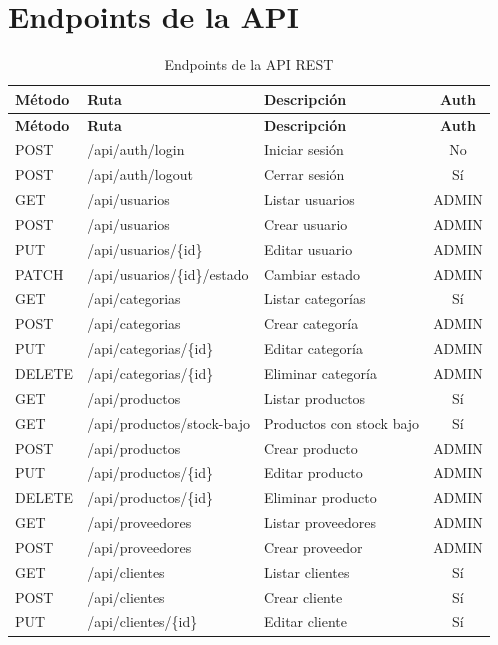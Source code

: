 \documentclass[12pt, letterpaper]{report}
\begin{document}
\section*{Endpoints de la API}

\begin{longtable}{|l|l|p{5cm}|c|}
\caption{Endpoints de la API REST} \\
\hline
\textbf{Método} & \textbf{Ruta} & \textbf{Descripción} & \textbf{Auth} \\ \hline
\endfirsthead
\hline
\textbf{Método} & \textbf{Ruta} & \textbf{Descripción} & \textbf{Auth} \\ \hline
\endhead
POST & /api/auth/login & Iniciar sesión & No \\ \hline
POST & /api/auth/logout & Cerrar sesión & Sí \\ \hline
GET & /api/usuarios & Listar usuarios & ADMIN \\ \hline
POST & /api/usuarios & Crear usuario & ADMIN \\ \hline
PUT & /api/usuarios/\{id\} & Editar usuario & ADMIN \\ \hline
PATCH & /api/usuarios/\{id\}/estado & Cambiar estado & ADMIN \\ \hline
GET & /api/categorias & Listar categorías & Sí \\ \hline
POST & /api/categorias & Crear categoría & ADMIN \\ \hline
PUT & /api/categorias/\{id\} & Editar categoría & ADMIN \\ \hline
DELETE & /api/categorias/\{id\} & Eliminar categoría & ADMIN \\ \hline
GET & /api/productos & Listar productos & Sí \\ \hline
GET & /api/productos/stock-bajo & Productos con stock bajo & Sí \\ \hline
POST & /api/productos & Crear producto & ADMIN \\ \hline
PUT & /api/productos/\{id\} & Editar producto & ADMIN \\ \hline
DELETE & /api/productos/\{id\} & Eliminar producto & ADMIN \\ \hline
GET & /api/proveedores & Listar proveedores & ADMIN \\ \hline
POST & /api/proveedores & Crear proveedor & ADMIN \\ \hline
GET & /api/clientes & Listar clientes & Sí \\ \hline
POST & /api/clientes & Crear cliente & Sí \\ \hline
PUT & /api/clientes/\{id\} & Editar cliente & Sí \\ \hline

\end{longtable}
\end{document}
